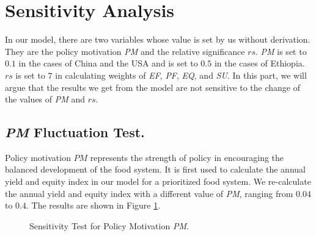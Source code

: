 \documentclass[12pt]{article}
\begin{document}
\section{Sensitivity Analysis}\label{sec:sense}
In our model, there are two variables whose value is set by us without derivation. They are the policy motivation \textit{PM} and the relative significance $rs$. \textit{PM} is set to $0.1$ in the cases of China and the USA and is set to $0.5$ in the cases of Ethiopia. $rs$ is set to $7$ in calculating weights of \textit{EF}, \textit{PF}, \textit{EQ}, and \textit{SU}. In this part, we will argue that the results we get from the model are not sensitive to the change of the values of \textit{PM} and $rs$.

\subsection{\textit{PM} Fluctuation Test.}
Policy motivation $PM$ represents the strength of policy in encouraging the balanced development of the food system. It is first used to calculate the annual yield and equity index in our model for a prioritized food system. We re-calculate the annual yield and equity index with a different value of \textit{PM}, ranging from $0.04$ to $0.4$. The results are shown in Figure \ref{fig:sense_pm}.
\begin{figure}[!htb]
    \centering
    \caption{Sensitivity Test for Policy Motivation \textit{PM}.\label{fig:sense_pm}}
\end{figure}
\end{document}
